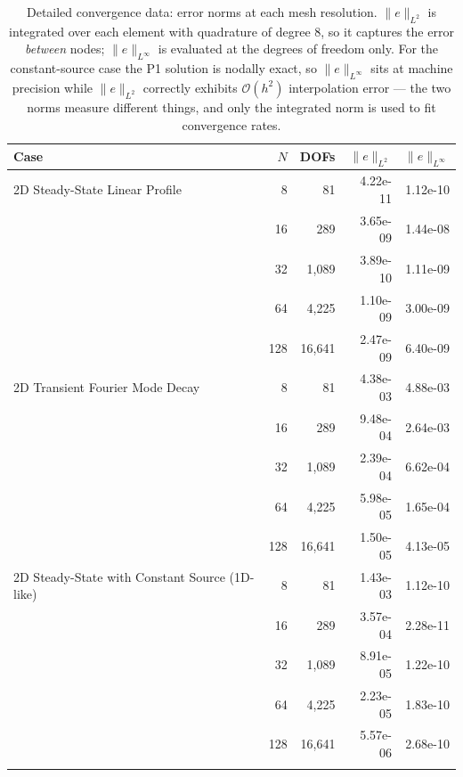 \begin{table}[htbp]
\centering\footnotesize
\caption{Detailed convergence data: error norms at each mesh resolution.  $\|e\|_{L^2}$ is integrated over each element with quadrature of degree 8, so it captures the error \emph{between} nodes; $\|e\|_{L^\infty}$ is evaluated at the degrees of freedom only.  For the constant-source case the P1 solution is nodally exact, so $\|e\|_{L^\infty}$ sits at machine precision while $\|e\|_{L^2}$ correctly exhibits $\mathcal{O}(h^2)$ interpolation error --- the two norms measure different things, and only the integrated norm is used to fit convergence rates.}
\label{tab:vv-detail}
\begin{tabular}{lrrrr}
\toprule
Case & $N$ & DOFs & $\|e\|_{L^2}$ & $\|e\|_{L^\infty}$ \\
\midrule
  2D Steady-State Linear Profile & 8 & 81 & 4.22e-11 & 1.12e-10 \\
   & 16 & 289 & 3.65e-09 & 1.44e-08 \\
   & 32 & 1,089 & 3.89e-10 & 1.11e-09 \\
   & 64 & 4,225 & 1.10e-09 & 3.00e-09 \\
   & 128 & 16,641 & 2.47e-09 & 6.40e-09 \\
\addlinespace
  2D Transient Fourier Mode Decay & 8 & 81 & 4.38e-03 & 4.88e-03 \\
   & 16 & 289 & 9.48e-04 & 2.64e-03 \\
   & 32 & 1,089 & 2.39e-04 & 6.62e-04 \\
   & 64 & 4,225 & 5.98e-05 & 1.65e-04 \\
   & 128 & 16,641 & 1.50e-05 & 4.13e-05 \\
\addlinespace
  2D Steady-State with Constant Source (1D-like) & 8 & 81 & 1.43e-03 & 1.12e-10 \\
   & 16 & 289 & 3.57e-04 & 2.28e-11 \\
   & 32 & 1,089 & 8.91e-05 & 1.22e-10 \\
   & 64 & 4,225 & 2.23e-05 & 1.83e-10 \\
   & 128 & 16,641 & 5.57e-06 & 2.68e-10 \\
\addlinespace
\bottomrule
\end{tabular}
\end{table}